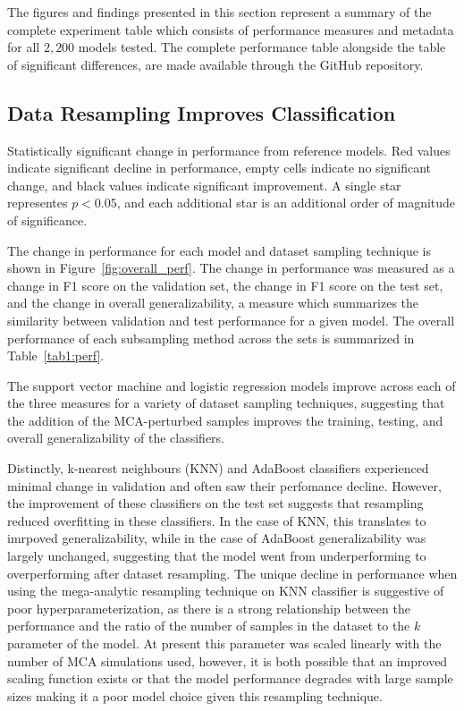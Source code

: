 \documentclass[10pt]{SelfArx} %
\begin{document}
The figures and findings presented in this section represent a summary of the complete experiment table which consists
of performance measures and metadata for all $2,200$ models tested. The complete performance table alongside the table
of significant differences, are made available through the GitHub repository.

\subsection*{Data Resampling Improves Classification}

\begin{table}[tbh]
\centering
\caption{Statistically significant change in performance from reference models. Red values indicate significant
decline in performance, empty cells indicate no significant change, and black values indicate significant improvement.
A single star representes $p < 0.05$, and each additional star is an additional order of magnitude of significance.}
\label{tab1:perf}
\small

\end{table}

The change in performance for each model and dataset sampling technique is shown in Figure~\ref{fig:overall_perf}. The
change in performance was measured as a change in F1 score on the validation set, the change in F1 score on the test
set, and the change in overall generalizability, a measure which summarizes the similarity between validation and test
performance for a given model. The overall performance of each subsampling method across the sets is summarized in
Table~\ref{tab1:perf}.

The support vector machine and logistic regression models improve across each of the three measures for a variety of
dataset sampling techniques, suggesting that the addition of the MCA-perturbed samples improves the training, testing,
and overall generalizability of the classifiers.

Distinctly, k-nearest neighbours (KNN) and AdaBoost classifiers experienced minimal change in validation and often saw
their perfomance decline. However, the improvement of these classifiers on the test set suggests that resampling
reduced overfitting in these classifiers. In the case of KNN, this translates to imrpoved generalizability, while in
the case of AdaBoost generalizability was largely unchanged, suggesting that the model went from underperforming to
overperforming after dataset resampling. The unique decline in performance when using the mega-analytic resampling
technique on KNN classifier is suggestive of poor hyperparameterization, as there is a strong relationship between the
performance and the ratio of the number of samples in the dataset to the $k$ parameter of the model. At present this
parameter was scaled linearly with the number of MCA simulations used, however, it is both possible that an improved
scaling function exists or that the model performance degrades with large sample sizes making it a poor model choice
given this resampling technique.
\end{document}
